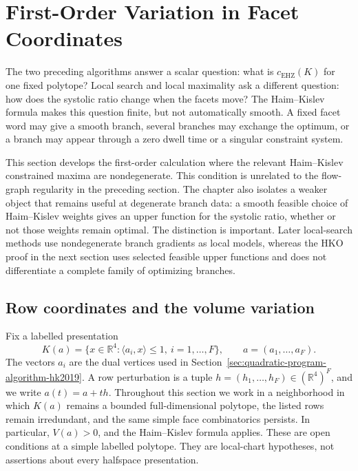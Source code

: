 \section{First-Order Variation in Facet Coordinates}
\label{sec:first-order-perturbations}

The two preceding algorithms answer a scalar question: what is
\(c_{\mathrm{EHZ}}(K)\) for one fixed polytope?  Local search and local
maximality ask a different question: how does the systolic ratio change when
the facets move?  The Haim--Kislev formula makes this question finite, but not
automatically smooth.  A fixed facet word may give a smooth branch, several
branches may exchange the optimum, or a branch may appear through a zero
dwell time or a singular constraint system.

This section develops the first-order calculation where the relevant
Haim--Kislev constrained maxima are nondegenerate.  This condition is
unrelated to the flow-graph regularity in the preceding section.  The chapter
also isolates a weaker object that remains useful at degenerate branch data:
a smooth feasible choice of Haim--Kislev
weights gives an upper function for the systolic ratio, whether or not those
weights remain optimal.  The distinction is important.  Later local-search
methods use nondegenerate branch gradients as local models, whereas the HKO proof in the next
section uses selected feasible upper functions and does not differentiate a
complete family of optimizing branches.

\subsection{Row coordinates and the volume variation}
\label{subsec:first-order-row-chart}

Fix a labelled presentation
\begin{equation}\label{eq:first-order-row-chart}
  K(a)=\{x\in\mathbb R^4:
    \langle a_i,x\rangle\leq 1,\ i=1,\ldots,F\},
  \qquad
  a=(a_1,\ldots,a_F).
\end{equation}
The vectors \(a_i\) are the dual vertices used in
Section~\ref{sec:quadratic-program-algorithm-hk2019}.  A row perturbation is a
tuple \(h=(h_1,\ldots,h_F)\in(\mathbb R^4)^F\), and we write
\(a(t)=a+th\).  Throughout this section we work in a neighborhood in which
\(K(a)\) remains a bounded full-dimensional polytope, the listed rows remain
irredundant, and the same simple face combinatorics persists.  In particular,
\(V(a)>0\), and the Haim--Kislev formula applies.  These are open conditions at
a simple labelled polytope.  They are local-chart hypotheses, not assertions
about every halfspace presentation.

